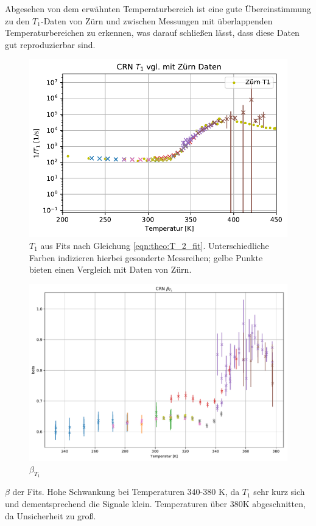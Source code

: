 Abgesehen von dem erwähnten Temperaturbereich ist eine gute Übereinstimmung zu den $T_1$-Daten von Zürn \cite{zuern_paper} und zwischen Messungen mit überlappenden Temperaturbereichen zu erkennen, was darauf schließen lässt, dass diese Daten gut reproduzierbar sind.

\begin{figure}
	\begin{center}
		\includegraphics[width=\textwidth]{graphics/plots/T1/t1.pdf}
	\end{center}
	\caption{$T_1$ aus Fits nach Gleichung \eqref{eqn:theo:T_2_fit}. Unterschiedliche Farben indizieren hierbei gesonderte Messreihen; gelbe Punkte bieten einen Vergleich mit Daten von Zürn.} \label{fig:res:T_1}
\end{figure}

\begin{figure}
	\begin{center}
		\includegraphics[width=\textwidth]{graphics/plots/T1/t1_beta.pdf}
	\end{center}
	\caption{$\beta_{T_1}$} \label{fig:res:beta_T_1}
\end{figure}
$\beta$ der Fits. Hohe Schwankung bei Temperaturen 340-380 K, da $T_1$ sehr kurz sich und dementsprechend die Signale klein. Temperaturen über 380K abgeschnitten, da Unsicherheit zu groß.


